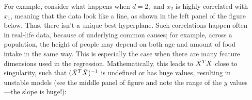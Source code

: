 For example, consider what happens when $d=2,$ and $x_2$ is highly
correlated with $x_1$, meaning that the data look like a line, as
shown in the left panel of the figure below.  Thus, there isn't a unique best hyperplane.  Such
correlations happen often in real-life data, because of underlying
common causes; for example, across a population, the height of people
may depend on both age and amount of food intake in the same way.
This is especially the case when there are many feature dimensions
used in the regression.  Mathematically, this leads to $\tilde{X}^T\tilde{X}$
close to singularity, such that $(\tilde{X}^T\tilde{X})^{-1}$ is undefined or has huge
values, resulting in unstable models (see the middle panel of figure
and note the range of the $y$ values---the slope is huge!):

